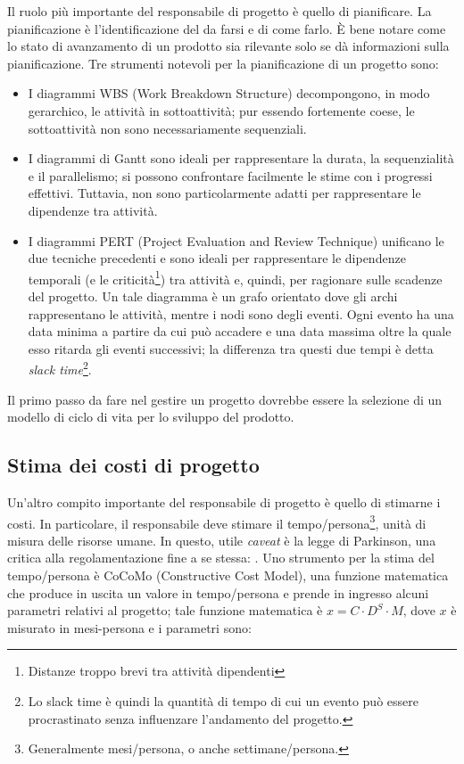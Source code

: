 \documentclass[a4paper]{article}
\begin{document}
		
Il ruolo più importante del responsabile di progetto è quello di pianificare. La pianificazione è l'identificazione del da farsi e di come farlo. È bene notare come lo stato di avanzamento di un prodotto sia rilevante solo se dà informazioni sulla pianificazione. Tre strumenti notevoli per la pianificazione di un progetto sono:
		
	\begin{itemize}
		
			
	\item I diagrammi WBS (Work Breakdown Structure) decompongono, in modo gerarchico, le attività in sottoattività; pur essendo fortemente coese, le sottoattività non sono necessariamente sequenziali.
			
	\item I diagrammi di Gantt sono ideali per rappresentare la durata, la sequenzialità e il parallelismo; si possono confrontare facilmente le stime con i progressi effettivi. Tuttavia, non sono particolarmente adatti per rappresentare le dipendenze tra attività.
			
	\item I diagrammi PERT (Project Evaluation and Review Technique) unificano le due tecniche precedenti e sono ideali per rappresentare le dipendenze temporali (e le criticità\footnote{Distanze troppo brevi tra attività dipendenti}) tra attività e, quindi, per ragionare sulle scadenze del progetto. Un tale diagramma è un grafo orientato dove gli archi rappresentano le attività, mentre i nodi sono degli eventi. Ogni evento ha una data minima a partire da cui può accadere e una data massima oltre la quale esso ritarda gli eventi successivi; la differenza tra questi due tempi è detta \emph{slack time}\footnote{Lo slack time è quindi la quantità di tempo di cui un evento può essere procrastinato senza influenzare l'andamento del progetto.}.
		
	\end{itemize}

		
Il primo passo da fare nel gestire un progetto dovrebbe essere la selezione di un modello di ciclo di vita per lo sviluppo del prodotto.

		
	\subsection{Stima dei costi di progetto}

		
Un'altro compito importante del responsabile di progetto è quello di stimarne i costi. In particolare, il responsabile deve stimare il tempo/persona\footnote{Generalmente mesi/persona, o anche settimane/persona.}, unità di misura delle risorse umane. In questo, utile \emph{caveat} è la legge di Parkinson, una critica alla regolamentazione fine a se stessa: . Uno strumento per la stima del tempo/persona è CoCoMo (Constructive Cost Model), una funzione matematica che produce in uscita un valore in tempo/persona e prende in ingresso alcuni parametri relativi al progetto; tale funzione matematica è $x = C \cdot{} D^{S} \cdot{} M$, dove $x$ è misurato in mesi-persona e i parametri sono:
		
\end{document}
